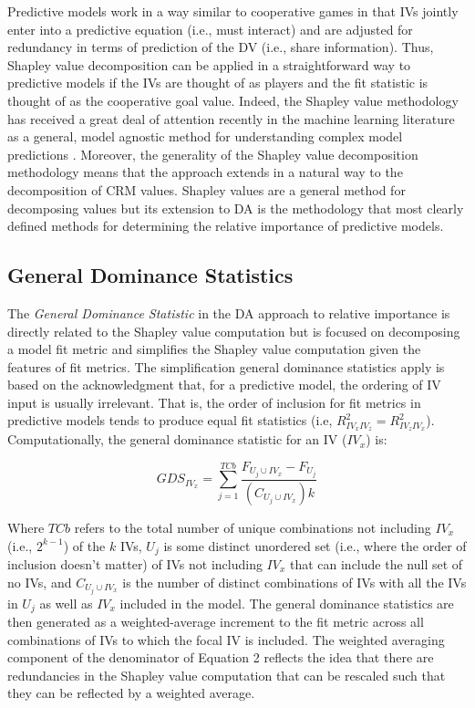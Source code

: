 \documentclass[ShortAfour,times,sageapa]{sagej}
\begin{document}
	Predictive models work in a way similar to cooperative games in that IVs jointly enter into a predictive equation (i.e., must interact) and are adjusted for redundancy in terms of prediction of the DV (i.e., share information).
	Thus, Shapley value decomposition can be applied in a straightforward way to predictive models if the IVs are thought of as players and the fit statistic is thought of as the cooperative goal value.
	Indeed, the Shapley value methodology has received a great deal of attention recently in the machine learning literature as a general, model agnostic method for understanding complex model predictions \cite[e.g., ]{lundberg2020local}.
	Moreover, the generality of the Shapley value decomposition methodology means that the approach extends in a natural way to the decomposition of CRM values. 
	Shapley values are a general method for decomposing values but its extension to DA is the methodology that most clearly defined methods for determining the relative importance of predictive models.
	
	\subsection{General Dominance Statistics}
	
	The \emph{General Dominance Statistic} in the DA approach to relative importance is directly related to the Shapley value computation but is focused on decomposing a model fit metric and simplifies the Shapley value computation given the features of fit metrics.
	The simplification general dominance statistics apply is based on the acknowledgment that, for a predictive model, the ordering of IV input is usually irrelevant.  That is, the order of inclusion for fit metrics in predictive models tends to produce equal fit statistics (i.e, $R^{2}_{IV_{x}IV_{z}} = R^{2}_{IV_{z}IV_{x}}$).	
	Computationally, the general dominance statistic for an IV ($IV_x$) is:
	
	\begin{equation}
		GDS_{IV_x} = \sum_{j=1}^{TCb} \frac{ F_{U_j \cup IV_x} - F_{U_j}}{(C_{U_j \cup IV_x}) k}
	\end{equation}
	
	Where $TCb$ refers to the total number of unique combinations not including $IV_x$ (i.e., $2^{k-1}$) of the $k$ IVs, $U_j$ is some distinct unordered set (i.e., where the order of inclusion doesn't matter) of IVs not including $IV_x$ that can include the null set of no IVs, and $C_{U_j \cup IV_x}$ is the number of distinct combinations of IVs with all the IVs in $U_j$ as well as $IV_x$ included in the model.		
	The general dominance statistics are then generated as a weighted-average increment to the fit metric across all combinations of IVs to which the focal IV is included.
	The weighted averaging component of the denominator of Equation 2 reflects the idea that there are redundancies in the Shapley value computation that can be rescaled such that they can be reflected by a weighted average.
	
\end{document}
